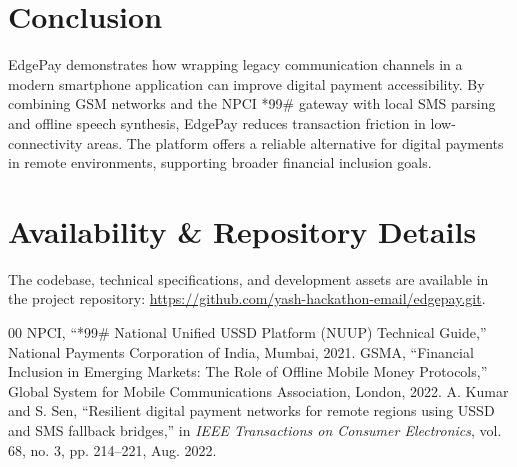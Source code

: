 \documentclass[10pt,journal,compsoc]{IEEEtran}
\begin{document}
\section{Conclusion}
EdgePay demonstrates how wrapping legacy communication channels in a modern smartphone application can improve digital payment accessibility. By combining GSM networks and the NPCI *99\# gateway with local SMS parsing and offline speech synthesis, EdgePay reduces transaction friction in low-connectivity areas. The platform offers a reliable alternative for digital payments in remote environments, supporting broader financial inclusion goals.

\section*{Availability \& Repository Details}
The codebase, technical specifications, and development assets are available in the project repository: \url{https://github.com/yash-hackathon-email/edgepay.git}.

\begin{thebibliography}{00}
 NPCI, ``*99\# National Unified USSD Platform (NUUP) Technical Guide,'' National Payments Corporation of India, Mumbai, 2021.
 GSMA, ``Financial Inclusion in Emerging Markets: The Role of Offline Mobile Money Protocols,'' Global System for Mobile Communications Association, London, 2022.
 A. Kumar and S. Sen, ``Resilient digital payment networks for remote regions using USSD and SMS fallback bridges,'' in \textit{IEEE Transactions on Consumer Electronics}, vol. 68, no. 3, pp. 214--221, Aug. 2022.
\end{thebibliography}
\end{document}

